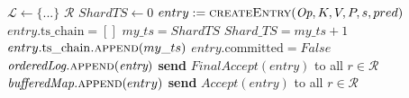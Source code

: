 \begin{algorithm}[!tb]
  \caption{Ellis\_Linear Leader}
  \label{ellis-lin-leaderprotocol}
  \begin{algorithmic}[1]
    \State $\mathcal{L} \gets \{...\}$ 
    \State $\mathcal{R}$ 
    \State $ShardTS \gets 0$
      \State $entry := \textsc{createEntry}(\textit{Op}, K, V, P, s, pred)$
        \State $entry.\mathrm{ts\_chain} = []$
        \State $my\_ts = ShardTS$
        \State $Shard\_TS = my\_ts + 1$
        \State $entry.\mathrm{ts\_chain}\textsc{.append}(my\_ts)$
        \State $entry.\mathrm{committed} = False$
        \State $\textit{orderedLog}\textsc{.append}(\textit{entry})$
        \State \textbf{send} $\textit{FinalAccept}(\textit{entry})$ to all $r \in \mathcal{R}$
        \Else
        \State $\textit{bufferedMap}\textsc{.append}(entry)$
        \State \textbf{send} $\textit{Accept}(entry)$ to all $r \in \mathcal{R}$
        \EndIf

\end{algorithmic}
\end{algorithm}
